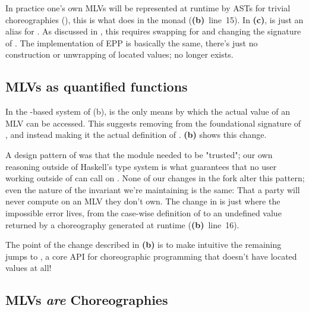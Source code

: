 \begin{figure*}[tbhp]
\begin{mdframed}
{	    In practice one's own MLVs will be represented at runtime by ASTs for trivial choreographies (\eg {}),
	    this is what  does in the  monad (\textbf{(b)}~line~15).
	    In \textbf{(c)},  is just an alias for .
	    As discussed in , this requires swapping  for 
	    and changing the signature of .
	    The implementation of EPP is basically the same, there's just no construction or unwrapping of located values;
	     no longer exists.
    }
    \label{fig:minichor-stg2}
  \end{mdframed}
\end{figure*}


\subsection{MLVs as quantified functions}
\label{sec:minichor-stg2}
In the -based system of (b),
 is the only means by which the actual value of an MLV can be accessed.
This suggests removing  from the foundational signature of ,
and instead making it the actual definition of .
\textbf{(b)} shows this change.

A design pattern of \MultiChor was that the  module needed to be "trusted";
our own reasoning outside of Haskell's type system is what guarantees that no user working outside of 
can call  on .
None of our changes in the \minichor fork alter this pattern;
even the nature of the invariant we're maintaining is the same:
That a party will never compute on an MLV they don't own.
The change in  is just where the impossible error lives,
from the case-wise definition of  to an undefined value returned by a choreography generated at runtime
(\textbf{(b)}~line~16).

The point of the change described in \textbf{(b)} is to make intuitive the remaining jumps to \minichor,
a core API for choreographic programming that
doesn't have located values at all!

\subsection{MLVs \emph{are} Choreographies}
\label{sec:minichor-stg3}

